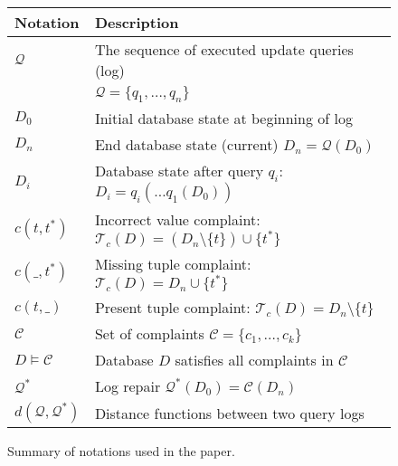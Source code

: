 
\begin{figure}[t]
\centering
{\small
\begin{tabular}{ll}
    \toprule
    \textbf{Notation} & \textbf{Description}\\
    \midrule
    $\mathcal{Q}$& The sequence of executed update queries (log)\\ 
             & $\mathcal{Q}=\{q_1, \dots, q_n\}$ \\
    $D_0$    & Initial database state at beginning of log\\
    $D_n$    & End database state (current) $D_n=\mathcal{Q}(D_0)$\\
    $D_i$    & Database state after query $q_i$: $D_i=q_i(\dots q_1(D_0))$\\
    $c(t,t^*)$ & Incorrect value complaint: $\mathcal{T}_c(D) = (D_n\setminus\{t\})\cup\{t^*\}$\\
    $c(\_,t^*)$ & Missing tuple complaint: $\mathcal{T}_c(D) = D_n\cup\{t^*\}$\\
    $c(t,\_)$ & Present tuple complaint: $\mathcal{T}_c(D) = D_n\setminus\{t\}$\\
    $\mathcal{C}$ & Set of complaints $\mathcal{C}=\{c_1,\dots,c_k\}$\\
    $D\models\mathcal{C}$   & Database $D$ satisfies all complaints in $\mathcal{C}$\\
    $\mathcal{Q}^*$& Log repair $\mathcal{Q}^*(D_0)=\mathcal{C}(D_n)$\\
    $d(\mathcal{Q}, \mathcal{Q}^*)$ & Distance functions between two query logs\\
    \bottomrule
\end{tabular}
}
\caption{Summary of notations used in the paper. }
\label{tbl:notation}
\end{figure}